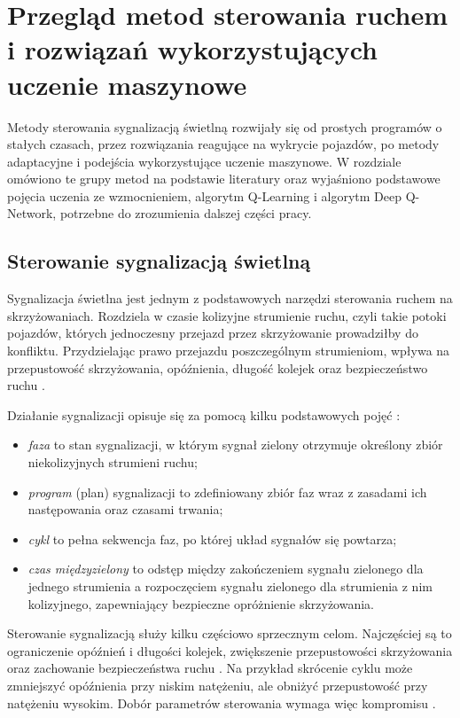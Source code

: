\clearpage
\section{Przegląd metod sterowania ruchem i rozwiązań wykorzystujących uczenie maszynowe}
\label{sec:przeglad}

Metody sterowania sygnalizacją świetlną rozwijały się od prostych programów o stałych czasach, przez rozwiązania reagujące na wykrycie pojazdów, po metody adaptacyjne i podejścia wykorzystujące uczenie maszynowe. W rozdziale omówiono te grupy metod na podstawie literatury oraz wyjaśniono podstawowe pojęcia uczenia ze wzmocnieniem, algorytm Q-Learning i algorytm Deep Q-Network, potrzebne do zrozumienia dalszej części pracy.

\subsection{Sterowanie sygnalizacją świetlną}
\label{subsec:sygnalizacja}

Sygnalizacja świetlna jest jednym z podstawowych narzędzi sterowania ruchem na skrzyżowaniach. Rozdziela w czasie kolizyjne strumienie ruchu, czyli takie potoki pojazdów, których jednoczesny przejazd przez skrzyżowanie prowadziłby do konfliktu. Przydzielając prawo przejazdu poszczególnym strumieniom, wpływa na przepustowość skrzyżowania, opóźnienia, długość kolejek oraz bezpieczeństwo ruchu \cite{NAP22097, koonce2008traffic}.

Działanie sygnalizacji opisuje się za pomocą kilku podstawowych pojęć \cite{koonce2008traffic, NAP22097}:
\begin{itemize}
    \item \emph{faza} to stan sygnalizacji, w którym sygnał zielony otrzymuje określony zbiór niekolizyjnych strumieni ruchu;
    \item \emph{program} (plan) sygnalizacji to zdefiniowany zbiór faz wraz z zasadami ich następowania oraz czasami trwania;
    \item \emph{cykl} to pełna sekwencja faz, po której układ sygnałów się powtarza;
    \item \emph{czas międzyzielony} to odstęp między zakończeniem sygnału zielonego dla jednego strumienia a rozpoczęciem sygnału zielonego dla strumienia z nim kolizyjnego, zapewniający bezpieczne opróżnienie skrzyżowania.
\end{itemize}

Sterowanie sygnalizacją służy kilku częściowo sprzecznym celom. Najczęściej są to ograniczenie opóźnień i długości kolejek, zwiększenie przepustowości skrzyżowania oraz zachowanie bezpieczeństwa ruchu \cite{NAP22097, LEITNER2022507}. Na przykład skrócenie cyklu może zmniejszyć opóźnienia przy niskim natężeniu, ale obniżyć przepustowość przy natężeniu wysokim. Dobór parametrów sterowania wymaga więc kompromisu \cite{NAP22097}.

